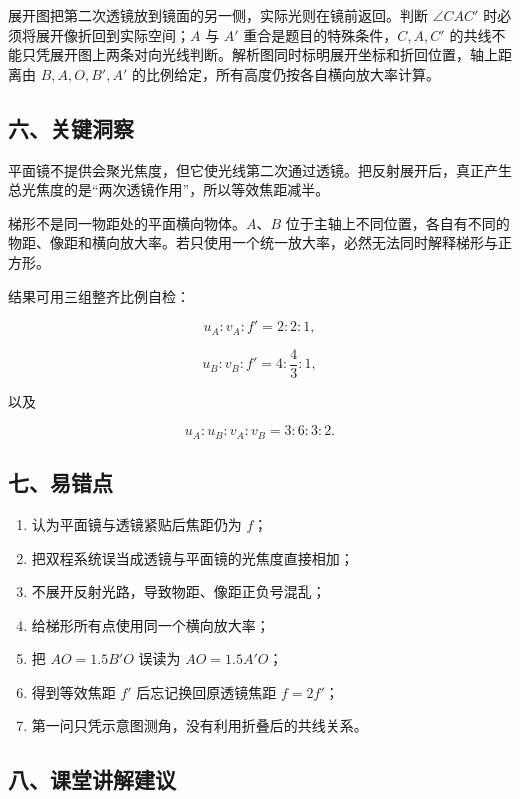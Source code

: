 \documentclass[12pt,a4paper,UTF8]{ctexart}
\newcommand{\tightlist}{\setlength{\itemsep}{0pt}\setlength{\parskip}{0pt}}
\begin{document}
展开图把第二次透镜放到镜面的另一侧，实际光则在镜前返回。判断
\(\angle CAC'\) 时必须将展开像折回到实际空间；\(A\) 与 \(A'\)
重合是题目的特殊条件，\(C,A,C'\)
的共线不能只凭展开图上两条对向光线判断。解析图同时标明展开坐标和折回位置，轴上距离由
\(B,A,O,B',A'\) 的比例给定，所有高度仍按各自横向放大率计算。

\subsection{六、关键洞察}\label{ux516dux5173ux952eux6d1eux5bdf-5}

平面镜不提供会聚光焦度，但它使光线第二次通过透镜。把反射展开后，真正产生总光焦度的是``两次透镜作用''，所以等效焦距减半。

梯形不是同一物距处的平面横向物体。\(A\)、\(B\)
位于主轴上不同位置，各自有不同的物距、像距和横向放大率。若只使用一个统一放大率，必然无法同时解释梯形与正方形。

结果可用三组整齐比例自检：

\[
u_A:v_A:f'=2:2:1,
\]

\[
u_B:v_B:f'=4:\frac43:1,
\]

以及

\[
u_A:u_B:v_A:v_B=3:6:3:2.
\]

\subsection{七、易错点}\label{ux4e03ux6613ux9519ux70b9-5}

\begin{enumerate}
\def\labelenumi{\arabic{enumi}.}
\tightlist
\item
  认为平面镜与透镜紧贴后焦距仍为 \(f\)；
\item
  把双程系统误当成透镜与平面镜的光焦度直接相加；
\item
  不展开反射光路，导致物距、像距正负号混乱；
\item
  给梯形所有点使用同一个横向放大率；
\item
  把 \(AO=1.5B'O\) 误读为 \(AO=1.5A'O\)；
\item
  得到等效焦距 \(f'\) 后忘记换回原透镜焦距 \(f=2f'\)；
\item
  第一问只凭示意图测角，没有利用折叠后的共线关系。
\end{enumerate}

\subsection{八、课堂讲解建议}\label{ux516bux8bfeux5802ux8bb2ux89e3ux5efaux8bae-5}
\end{document}
